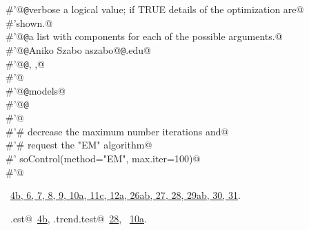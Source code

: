\documentclass[reqno]{amsart}
\renewcommand{\NWlink}[2]{\hyperlink{#1}{#2}}
\begin{document}
\begin{flushleft}
\begin{list}{}{}
\mbox{}\verb@#'@{\tt @}\verb@param verbose a logical value; if TRUE details of the optimization are@\\
\mbox{}\verb@#'shown.@\\
\mbox{}\verb@#'@{\tt @}\verb@return a list with components for each of the possible arguments.@\\
\mbox{}\verb@#'@{\tt @}\verb@author Aniko Szabo aszabo@{\tt @}\verb@mcw.edu@\\
\mbox{}\verb@#'@{\tt @}\verb@seealso {}, ,@\\
\mbox{}\verb@#'@\\
\mbox{}\verb@#'@{\tt @}\verb@keywords models@\\
\mbox{}\verb@#'@{\tt @}\verb@examples@\\
\mbox{}\verb@#'@\\
\mbox{}\verb@#'# decrease the maximum number iterations and@\\
\mbox{}\verb@#'# request the "EM" algorithm@\\
\mbox{}\verb@#' soControl(method="EM", max.iter=100)@\\
\mbox{}\verb@#'@\\
\mbox{}\verb@@{\NWsep}
\end{list}
\vspace{-1.5ex}
\footnotesize
\begin{list}{}{\setlength{\itemsep}{-\parsep}\setlength{\itemindent}{-\leftmargin}}
\item \NWtxtFileDefBy\ \NWlink{nuweb4b}{4b}\NWlink{nuweb6}{, 6}\NWlink{nuweb7}{, 7}\NWlink{nuweb8}{, 8}\NWlink{nuweb9}{, 9}\NWlink{nuweb10a}{, 10a}\NWlink{nuweb11c}{, 11c}\NWlink{nuweb12a}{, 12a}\NWlink{nuweb26a}{, 26a}\NWlink{nuweb26b}{b}\NWlink{nuweb27}{, 27}\NWlink{nuweb28}{, 28}\NWlink{nuweb29a}{, 29a}\NWlink{nuweb29b}{b}\NWlink{nuweb30}{, 30}\NWlink{nuweb31}{, 31}.
\item \NWtxtIdentsUsed\nobreak\  \verb@mc.est@\nobreak\ \NWlink{nuweb4b}{4b}, \verb@SO.trend.test@\nobreak\ \NWlink{nuweb28}{28}, \verb@soControl@\nobreak\ \NWlink{nuweb10a}{10a}.
\item{}
\end{list}
\vspace{4ex}
\end{flushleft}
\end{document}
